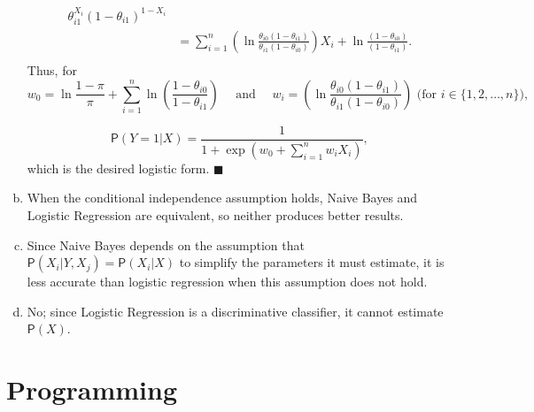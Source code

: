 \documentclass[11pt]{article}
\renewcommand{\qed}{\quad $\blacksquare$}
\newcommand{\pr}[1]{\mathsf{P}\left( #1 \right)} %
\begin{document}
\begin{enumerate}[a.]
\begin{align*}
              {\theta_{i1}^{X_i}(1 - \theta_{i1})^{1 - X_i}}                \\
 & = \sum_{i = 1}^n \left( \ln \frac{\theta_{i0}(1 - \theta_{i1})}
                     {\theta_{i1}(1 - \theta_{i0})}  \right) X_i
   + \ln \frac{(1 - \theta_{i0})}{(1 - \theta_{i1})}.                       \\
\end{align*}
Thus, for
\[w_0 = \ln \frac{1 - \pi}{\pi}
  + \sum_{i = 1}^n \ln \left( \frac{1 - \theta_{i0}}{1 - \theta_{i1}} \right)
   \quad \mbox{ and } \quad
  w_i = \left( \ln \frac{\theta_{i0}(1 - \theta_{i1})}
                      {\theta_{i1}(1 - \theta_{i0})} \right)
         \mbox{ (for $i \in \{1,2,\dots,n\}$),}
\]

\[\pr{Y = 1 | X}
 = \frac{1}{1 + \exp \left( w_0 + \sum_{i = 1}^n w_iX_i\right)},\]
which is the desired logistic form. \qed

\item When the conditional independence assumption holds, Naive Bayes and
Logistic Regression are equivalent, so neither produces better results.

\item Since Naive Bayes depends on the assumption that
$\pr{X_i | Y,X_j} = \pr{X_i | X}$ to simplify the parameters it must estimate,
it is less accurate than logistic regression when this assumption does not
hold.

\item No; since Logistic Regression is a discriminative classifier, it cannot
estimate $\pr{X}$.

\end{enumerate}

\section{Programming}
\end{document}
